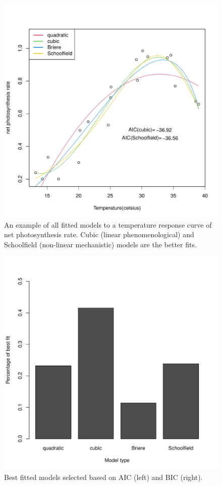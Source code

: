 \documentclass[11pt, a4paper]{article}
\begin{document}
\begin{spacing}{1.5}
\begin{figure}[H]
    \centering
    \includegraphics[scale=0.7]{../results/341.pdf}
    \caption{An example of all fitted models to a temperature response curve of net photosynthesis rate. Cubic (linear phenomenological) and Schoolfield (non-linear mechanistic) models are the better fits.}
    \label{fig:341}
\end{figure}

\begin{figure}[H]
    \centering
    \includegraphics[scale=0.7]{../results/bestfit.pdf}
    \caption{Best fitted models selected based on AIC (left) and BIC (right).}
    \label{fig:bestfit}
\end{figure}


\end{spacing}
\end{document}
